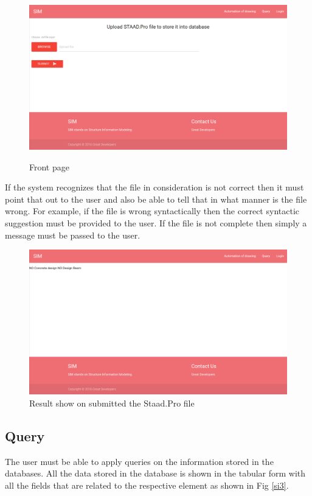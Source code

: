 \begin{figure}[h!]
\begin{center}
\includegraphics[scale=0.33]{images/sim_index.png}
\label{si}
\caption{Front page}
\end{center}
\end{figure}

If the system recognizes that the file in consideration is not correct then it must point that out to the user and also be able to tell that in what manner is the file wrong. For example, if the file is wrong syntactically then the correct syntactic suggestion must be provided to the user.  If the file is not complete then simply a message must be passed to the user.

\begin{figure}[h!]
\begin{center}
\includegraphics[scale=0.33]{images/after_upload.png}
\caption{Result show on submitted the Staad.Pro file}
\label{si2}  
\end{center}
\end{figure}
\newpage
\subsection{Query}
The user must be able to apply queries on the information stored in the databases.
All the data stored in the database is shown in the tabular form with all the fields that are related to the respective element as shown in Fig \ref{si3}.

